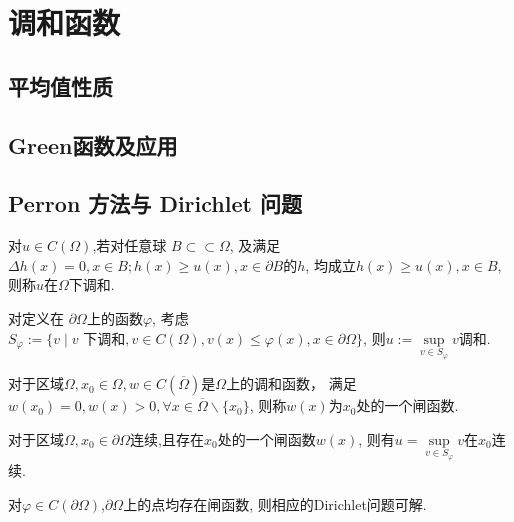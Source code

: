 \newcommand{\diam}{\operatorname{diam}}

\section{调和函数}
\subsection{平均值性质}
\subsection{Green函数及应用}
\subsection{Perron 方法与 Dirichlet 问题}

\begin{definition}
    对$u\in C(\Omega)$,若对任意球 $B\subset \subset \Omega $,
    及满足 $\Delta h(x)=0,x\in B ;h(x)\geq u(x),x\in \partial B$的$h$,
    均成立$h(x)\geq u(x),x\in B$,则称$u$在$\Omega$下调和.
\end{definition}

\begin{proposition}
    对定义在 $\partial \Omega$上的函数$\varphi$,
    考虑 $S_\varphi:=\{ v\mid v\text{ 下调和},
    v\in C(\Omega),v(x)\leq \varphi (x),x\in\partial \Omega\}$,
    则$u:= \sup \limits_{v\in S_\varphi} v $调和.
\end{proposition}

\begin{definition}
    对于区域$\Omega,x_0\in \Omega,w\in C(\overline{\Omega})$是$\Omega$上的调和函数，
    满足$w(x_0)=0,w(x)>0,\forall x\in \overline{\Omega}\backslash \{x_0\}$,
    则称$w(x)$为$x_0 $处的一个闸函数.
\end{definition}

\begin{proposition}
    对于区域$\Omega,x_0\in \partial \Omega$连续,且存在$x_0$处的一个闸函数$w(x)$,
    则有$u= \sup\limits_{v\in S_\varphi}v$在$x_0$连续.
\end{proposition}

\begin{theorem}
    对$\varphi\in C(\partial \Omega)$,$\partial \Omega$上的点均存在闸函数,
    则相应的Dirichlet问题可解.
\end{theorem}

